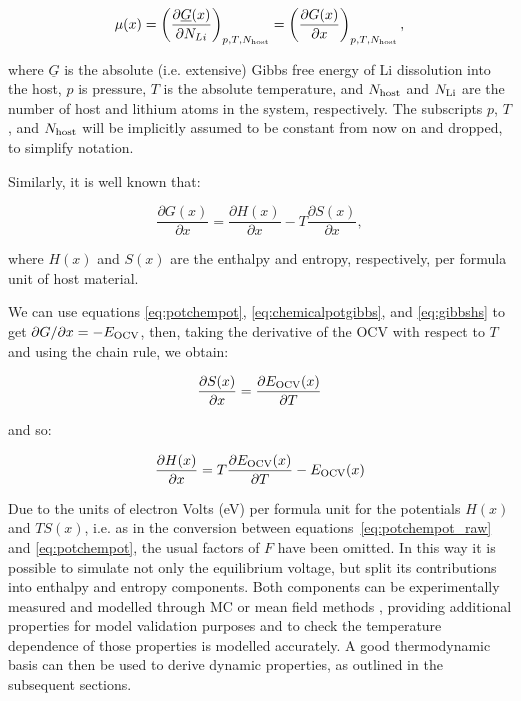 \documentclass[../main.tex]{subfiles}
\begin{document}
\begin{equation}
    \mu(x) = \left(\frac{\partial{\underline{G}(x)}}{\partial{N_{Li}}}\right)_{p,T,N_{\rm{host}}} = \left(\frac{\partial{G(x)}}{\partial{x}}\right)_{p,T,N_{\rm{host}}},
    \label{eq:chemicalpotgibbs}
\end{equation}

where $\underline{G}$ is the absolute (i.e. extensive) Gibbs free energy of Li dissolution into the host, $p$ is pressure, $T$ is the absolute temperature, and $N_{\rm{host}}$ and $N_{\rm{Li}}$ are the number of host and lithium atoms in the system, respectively. The subscripts $p$, $T$, and $N_{\rm{host}}$ will be implicitly assumed to be constant from now on and dropped, to simplify notation.

Similarly, it is well known that:

\begin{equation}
    \frac{\partial{G(x)}}{\partial{x}} = \frac{\partial{H(x)}}{\partial{x}} - T\frac{\partial{S(x)}}{\partial{x}}, 
    \label{eq:gibbshs}
\end{equation}

where $H(x)$ and $S(x)$ are the enthalpy and entropy, respectively, per formula unit of host material.

We can use equations \ref{eq:potchempot}, \ref{eq:chemicalpotgibbs}, and \ref{eq:gibbshs} to get $\partial{G}/\partial{x} = -E_{\rm{OCV}}$, then, taking the derivative of the OCV with respect to $T$ and using the chain rule, we obtain:

\begin{equation}
   \frac{\partial{S(x)}}{\partial{x}} = \frac{\partial{E_{\rm{OCV}}(x)}}{\partial{T}}
    \label{eq:entropy_measurement}
\end{equation}

and so:

\begin{equation}
    \frac{\partial{H(x)}}{\partial{x}} = T\frac{\partial{E_{\rm{OCV}}(x)}}{\partial{T}} - E_{\rm{OCV}}(x)
    \label{eq:enthalpy_measurement}
\end{equation}

Due to the units of electron Volts (eV) per formula unit for the potentials $H(x)$ and $TS(x)$, i.e. as in the conversion between equations~\ref{eq:potchempot_raw} and \ref{eq:potchempot}, the usual factors of $F$ have been omitted. In this way it is possible to simulate not only the equilibrium voltage, but split its contributions into enthalpy and entropy components. Both components can be experimentally measured \cite{schlueter_quantifying_2018, Mercer2019, THOMAS2003844,Reynier2004,Yazami_2006} and modelled through MC or mean field methods \cite{schlueter_quantifying_2018,mercer_influence_2017,Mercer2019,Leiva2017b}, providing additional properties for model validation purposes and to check the temperature dependence of those properties is modelled accurately. A good thermodynamic basis can then be used to derive dynamic properties, as outlined in the subsequent sections.
\end{document}
